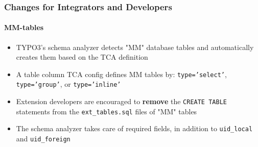 %

\begin{frame}[fragile]
	\frametitle{Changes for Integrators and Developers}
	\framesubtitle{MM-tables}

	\begin{itemize}
		\item TYPO3's schema analyzer detects "MM" database tables and
			automatically creates them based on the TCA definition
		\item A table column TCA config defines MM tables by:\newline
			\small\texttt{type='select'}, \texttt{type='group'}, or \texttt{type='inline'}\normalsize
		\item Extension developers are encouraged to \textbf{remove} the
			\texttt{CREATE TABLE} statements from the \texttt{ext\_tables.sql}
			files of "MM" tables
		\item The schema analyzer takes care of required fields, in addition to
			\small\texttt{uid\_local} and \texttt{uid\_foreign}\normalsize
	\end{itemize}

\end{frame}

